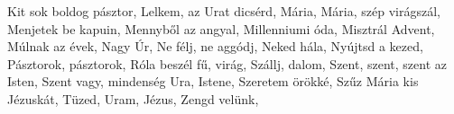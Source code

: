 \begin{multicols}{2}
\begin{minipage}{\textwidth}
Kit sok boldog pásztor, \pageref{KitsokboldogpC3A1sztor}\newline
Lelkem, az Urat dicsérd, \pageref{Lelkem2CazUratdicsC3A9rd}\newline
Mária, Mária, szép virágszál, \pageref{MC3A1ria2CMC3A1ria2CszC3A9pvirC3A1gszC3A1l}\newline
Menjetek be kapuin, \pageref{Menjetekbekapuin}\newline
Mennyből az angyal, \pageref{MennybC591lazangyal}\newline
Millenniumi óda, \pageref{MillenniumiC3B3da}\newline
Misztrál Advent, \pageref{MisztrC3A1lAdvent}\newline
Múlnak az évek, \pageref{MC3BAlnakazC3A9vek}\newline
Nagy Úr, \pageref{NagyC39Ar}\newline
Ne félj, ne aggódj, \pageref{NefC3A9lj2CneaggC3B3dj}\newline
Neked hála, \pageref{NekedhC3A1la}\newline
Nyújtsd a kezed, \pageref{NyC3BAjtsdakezed}\newline
Pásztorok, pásztorok, \pageref{PC3A1sztorok2CpC3A1sztorok}\newline
Róla beszél fű, virág, \pageref{RC3B3labeszC3A9lfC5B12CvirC3A1g}\newline
Szállj, dalom, \pageref{SzC3A1llj2Cdalom}\newline
Szent, szent, szent az Isten, \pageref{Szent2Cszent2CszentazIsten}\newline
Szent vagy, mindenség Ura, Istene, \pageref{Szentvagy2CmindensC3A9gUra2CIstene}\newline
Szeretem örökké, \pageref{SzeretemC3B6rC3B6kkC3A9}\newline
Szűz Mária kis Jézuskát, \pageref{SzC5B1zMC3A1riakisJC3A9zuskC3A1t}\newline
Tüzed, Uram, Jézus, \pageref{TC3BCzed2CUram2CJC3A9zus}\newline
Zengd velünk, \pageref{ZengdvelC3BCnk}\newline

\end{minipage}
\begin{minipage}{\textwidth}

\end{minipage}
\end{multicols}
